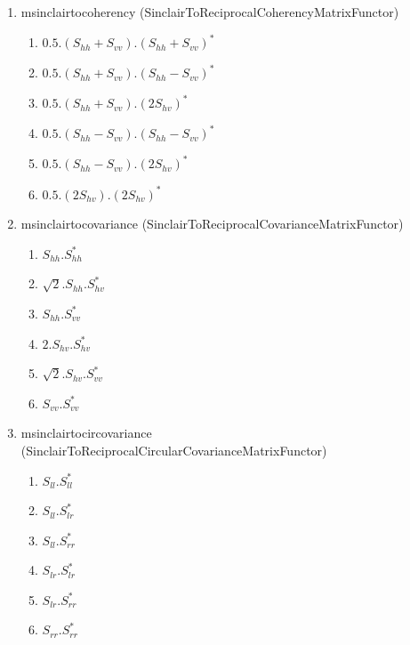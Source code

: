 \begin{enumerate}
\renewcommand{\labelenumii}{Channel \arabic{enumii} : }
\item msinclairtocoherency (SinclairToReciprocalCoherencyMatrixFunctor)
\begin{enumerate}
\item $ 0.5 . (S_{hh}+S_{vv}).(S_{hh}+S_{vv})^{*} $
\item $ 0.5 . (S_{hh}+S_{vv}).(S_{hh}-S_{vv})^{*} $
\item $ 0.5 . (S_{hh}+S_{vv}).(2 S_{hv})^{*} $
\item $ 0.5 . (S_{hh}-S_{vv}).(S_{hh}-S_{vv})^{*} $
\item $ 0.5 . (S_{hh}-S_{vv}).(2 S_{hv})^{*} $
\item $ 0.5 . (2 S_{hv}).(2 S_{hv})^{*} $
\end{enumerate}
 
\item msinclairtocovariance (SinclairToReciprocalCovarianceMatrixFunctor)
\begin{enumerate}
\item $ S_{hh}.S_{hh}^{*} $ 
\item $ \sqrt{2}.S_{hh}.S_{hv}^{*} $ 
\item $ S_{hh}.S_{vv}^{*} $ 
\item $ 2.S_{hv}.S_{hv}^{*} $ 
\item $ \sqrt{2}.S_{hv}.S_{vv}^{*} $ 
\item $ S_{vv}.S_{vv}^{*} $
\end{enumerate}
 
\item msinclairtocircovariance (SinclairToReciprocalCircularCovarianceMatrixFunctor)
\begin{enumerate}
\item $ S_{ll}.S_{ll}^{*} $ 
\item $ S_{ll}.S_{lr}^{*} $ 
\item $ S_{ll}.S_{rr}^{*} $ 
\item $ S_{lr}.S_{lr}^{*} $ 
\item $ S_{lr}.S_{rr}^{*} $ 
\item $ S_{rr}.S_{rr}^{*} $
\end{enumerate}
 

\end{enumerate}
